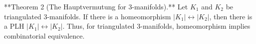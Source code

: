 **Theorem 2 (The Hauptvermutung for 3-manifolds).** Let $K_1$ and $K_2$ be triangulated 3-manifolds. If there is a homeomorphism $|K_1| \leftrightarrow |K_2|$, then there is a PLH $|K_1| \leftrightarrow |K_2|$. Thus, for triangulated 3-manifolds, homeomorphism implies combinatorial equivalence.
